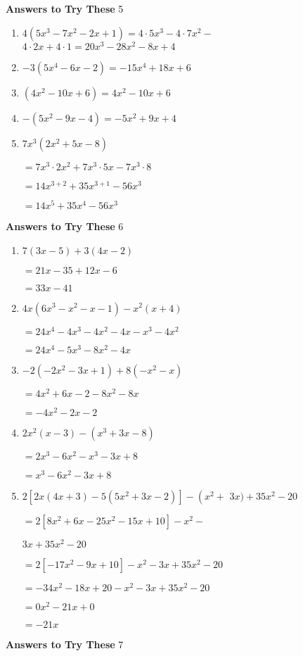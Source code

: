 \documentclass[a4paper]{JAC2003}
\begin{document}
\noindent\textcolor{red!75!black}{\textbf{Answers to Try These}} 5
\begin{enumerate}
\item $4\left(5 x^{3}-7 x^{2}-2 x+1\right)=4 \cdot 5 x^{3}-4 \cdot 7 x^{2}-$ $4 \cdot 2 x+4 \cdot 1=20 x^{3}-28 x^{2}-8 x+4$

\item $-3\left(5 x^{4}-6 x-2\right)=-15 x^{4}+18 x+6$

\item $\left(4 x^{2}-10 x+6\right)=4 x^{2}-10 x+6$

\item $-\left(5 x^{2}-9 x-4\right)=-5 x^{2}+9 x+4$

\item $7 x^{3}\left(2 x^{2}+5 x-8\right)$

$=7 x^{3} \cdot 2 x^{2}+7 x^{3} \cdot 5 x-7 x^{3} \cdot 8$

$=14 x^{3+2}+35 x^{3+1}-56 x^{3}$

$=14 x^{5}+35 x^{4}-56 x^{3}$
\end{enumerate}

\noindent\textcolor{red!75!black}{\textbf{Answers to Try These}} 6
\begin{enumerate}
\item $7(3 x-5)+3(4 x-2)$

$=21 x-35+12 x-6$

$=33 x-41$

\item $4 x\left(6 x^{3}-x^{2}-x-1\right)-x^{2}(x+4)$

$=24 x^{4}-4 x^{3}-4 x^{2}-4 x-x^{3}-4 x^{2}$

$=24 x^{4}-5 x^{3}-8 x^{2}-4 x$

\item $-2\left(-2 x^{2}-3 x+1\right)+8\left(-x^{2}-x\right)$

$=4 x^{2}+6 x-2-8 x^{2}-8 x$

$=-4 x^{2}-2 x-2$ %

\item $2 x^{2}(x-3)-\left(x^{3}+3 x-8\right)$

$=2 x^{3}-6 x^{2}-x^{3}-3 x+8$

$=x^{3}-6 x^{2}-3 x+8$

\item $2\left[2 x(4 x+3)-5\left(5 x^{2}+3 x-2\right)\right]-\left(x^{2}+\right.$ $3 x)+35 x^{2}-20$

$=2\left[8 x^{2}+6 x-25 x^{2}-15 x+10\right]-x^{2}-$

$3 x+35 x^{2}-20$

$=2\left[-17 x^{2}-9 x+10\right]-x^{2}-3 x+35 x^{2}-20$

$=-34 x^{2}-18 x+20-x^{2}-3 x+35 x^{2}-20$

$=0 x^{2}-21 x+0$

$=-21 x$
\end{enumerate}
\newpage
\noindent\textcolor{red!75!black}{\textbf{Answers to Try These}} 7
\end{document}
